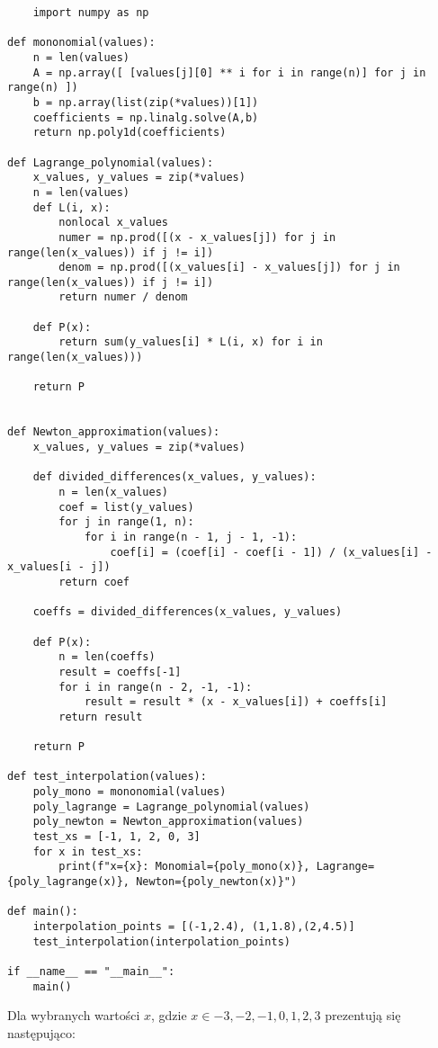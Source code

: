 \documentclass{article}
\begin{document}
\begin{verbatim}
    import numpy as np

def mononomial(values):
    n = len(values)
    A = np.array([ [values[j][0] ** i for i in range(n)] for j in range(n) ])
    b = np.array(list(zip(*values))[1])
    coefficients = np.linalg.solve(A,b)
    return np.poly1d(coefficients)

def Lagrange_polynomial(values):
    x_values, y_values = zip(*values)
    n = len(values)
    def L(i, x):
        nonlocal x_values
        numer = np.prod([(x - x_values[j]) for j in range(len(x_values)) if j != i])
        denom = np.prod([(x_values[i] - x_values[j]) for j in range(len(x_values)) if j != i])
        return numer / denom
    
    def P(x):
        return sum(y_values[i] * L(i, x) for i in range(len(x_values)))
    
    return P


def Newton_approximation(values):
    x_values, y_values = zip(*values)
    
    def divided_differences(x_values, y_values):
        n = len(x_values)
        coef = list(y_values)
        for j in range(1, n):
            for i in range(n - 1, j - 1, -1):
                coef[i] = (coef[i] - coef[i - 1]) / (x_values[i] - x_values[i - j])
        return coef
    
    coeffs = divided_differences(x_values, y_values)
    
    def P(x):
        n = len(coeffs)
        result = coeffs[-1]
        for i in range(n - 2, -1, -1):
            result = result * (x - x_values[i]) + coeffs[i]
        return result
    
    return P

def test_interpolation(values):
    poly_mono = mononomial(values)
    poly_lagrange = Lagrange_polynomial(values)
    poly_newton = Newton_approximation(values)
    test_xs = [-1, 1, 2, 0, 3]
    for x in test_xs:
        print(f"x={x}: Monomial={poly_mono(x)}, Lagrange={poly_lagrange(x)}, Newton={poly_newton(x)}")

def main():
    interpolation_points = [(-1,2.4), (1,1.8),(2,4.5)]
    test_interpolation(interpolation_points)

if __name__ == "__main__":
    main()
\end{verbatim}

Dla wybranych wartości $x$, gdzie $x \in {-3,-2,-1, 0, 1, 2, 3} $ prezentują się następująco:
\end{document}
